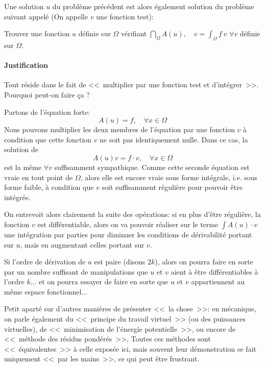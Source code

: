 \medskip
Une solution $u$ du problème précédent est alors également solution du problème suivant
appelé  (On appelle $v$ une fonction test):
\begin{center}
    Trouver une fonction $u$ définie sur $\Omega$ vérifiant $\dint_\Omega A(u),\quad v = \int_\Omega f\ v$
$\forall v$ définie sur $\Omega$.
\end{center}



\medskip{}%
\medskip

%


\paragraph{Justification}
Tout réside dans le fait de <<~multiplier par une fonction test et d'intégrer~>>.
Pourquoi peut-on faire ça ?

Partons de l'équation forte:
\begin{equation}A(u)=f,\quad \forall x\in\Omega\end{equation}
Nous pouvons multiplier les deux membres de l'équation par une fonction $v$ à
condition que cette fonction $v$ ne soit pas identiquement nulle. Dans ce cas, la solution de
\begin{equation}A(u)v=f\cdot v,\quad \forall x\in\Omega\end{equation} est la même $\forall v$ suffisamment sympathique.
Comme cette seconde équation est vraie en tout point de $\Omega$, alors elle
est encore vraie sous forme intégrale, i.e. sous forme faible, à condition que
$v$ soit suffisamment régulière pour pouvoir être intégrée.

On entrevoit alors clairement la suite des opérations: si en plus d'être régulière,
la fonction $v$ est différentiable, alors on va pouvoir réaliser sur le terme $\int A(u)\cdot v$
une intégration par parties pour diminuer les conditions de dérivabilité portant sur $u$,
mais en augmentant celles portant sur $v$.

Si l'ordre de dérivation de $u$ est paire (disons $2k$), alors on pourra faire en sorte
par un nombre suffisant de manipulations que $u$ et $v$ aient à être différentiables
à l'ordre $k$... et on pourra essayer de faire en sorte que $u$ et $v$ appartiennent au
même espace fonctionnel...

\medskip
{}
Petit aparté sur d'autres manières de présenter <<~la chose~>>:
en mécanique, on parle également du <<~principe du travail virtuel~>> (ou des puissances virtuelles),
de <<~minimisation de l'énergie potentielle~>>, ou encore de <<~méthode des résidus pondérés~>>,
Toutes ces méthodes sont <<~équivalentes~>> à celle exposée ici, mais souvent
leur démonstration se fait uniquement <<~par les mains~>>, ce qui peut être
frustrant.


